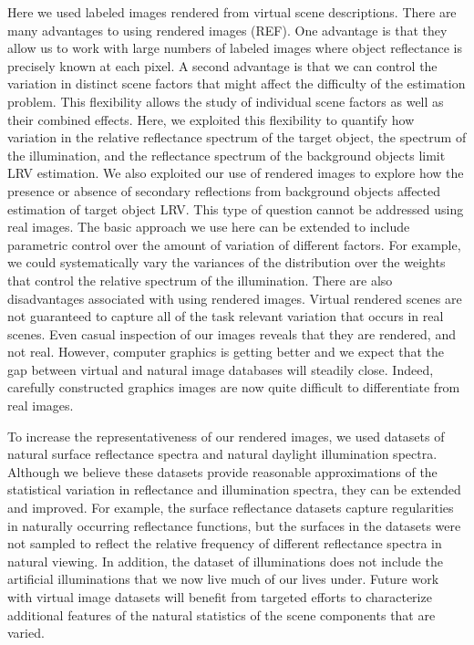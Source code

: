\documentclass{jov}
\begin{document}
Here we used labeled images rendered from virtual scene descriptions. 
There are many advantages to using rendered images (REF).
One advantage is that they allow us to work with large numbers of labeled images where object reflectance is precisely known at each pixel.
A second advantage is that we can control the variation in distinct scene factors that might affect the difficulty of the estimation problem.
This flexibility allows the study of individual scene factors as well as their combined effects.
Here, we exploited this flexibility to quantify how variation in the relative reflectance spectrum of the target object, the spectrum of the illumination, and the reflectance spectrum of the background objects limit LRV estimation.
We also exploited our use of rendered images to explore how the presence or absence of secondary reflections from background objects affected estimation
of target object LRV.
This type of question cannot be addressed using real images.
The basic approach we use here can be extended to include parametric control over the amount of variation of different factors.
For example, we could systematically vary the variances of the distribution over the weights that control the relative spectrum
of the illumination.
There are also disadvantages associated with using rendered images. 
Virtual rendered scenes are not guaranteed to capture all of the task relevant variation that occurs in real scenes.
Even casual inspection of our images reveals that they are rendered, and not real.
However, computer graphics is getting better and we expect that the gap between virtual and natural image databases will steadily close.
Indeed, carefully constructed graphics images are now quite difficult to differentiate from real images.

To increase the representativeness of our rendered images, we used datasets of  natural surface reflectance spectra and natural daylight illumination spectra.
Although we believe these datasets provide reasonable approximations of the statistical variation in reflectance and illumination spectra, they can be extended and improved.
For example, the surface reflectance datasets capture regularities in naturally occurring reflectance functions, but the surfaces in the datasets were not sampled to reflect the relative frequency of different reflectance spectra in natural viewing. 
In addition, the dataset of illuminations does not include the artificial illuminations that we now live much of our lives under.
Future work with virtual image datasets will benefit from targeted efforts to characterize additional features of the natural statistics of the scene components that are varied.
\end{document}
